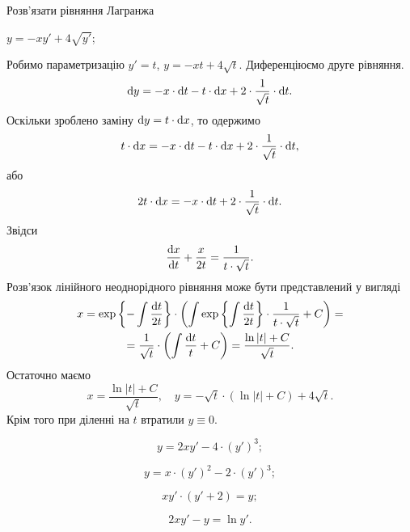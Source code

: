 Розв’язати рівняння Лагранжа
\begin{example}
	$y = - x y' + 4 \sqrt{y'}$;
\end{example}
\begin{solution}
	Робимо параметризацію $y' = t$, $y = - xt + 4 \sqrt{t}$. Диференціюємо друге рівняння.
	\[ \mathop{}\!\mathrm{d} y = - x \cdot \mathop{}\!\mathrm{d} t - t \cdot \mathop{}\!\mathrm{d} x + 2 \cdot \frac{1}{\sqrt{t}} \cdot \mathop{}\!\mathrm{d} t.\]
	Оскільки зроблено заміну $\mathop{}\!\mathrm{d} y = t \cdot \mathop{}\!\mathrm{d} x$, то одержимо
	\[ t \cdot \mathop{}\!\mathrm{d} x = - x \cdot \mathop{}\!\mathrm{d} t - t \cdot \mathop{}\!\mathrm{d} x + 2 \cdot \frac{1}{\sqrt{t}} \cdot \mathop{}\!\mathrm{d} t,\]
	або
	\[ 2 t \cdot \mathop{}\!\mathrm{d} x = - x \cdot \mathop{}\!\mathrm{d} t + 2 \cdot \frac{1}{\sqrt{t}} \cdot \mathop{}\!\mathrm{d} t.\]
	Звідси
	\[ \frac{\mathop{}\!\mathrm{d} x}{\mathop{}\!\mathrm{d} t} + \frac{x}{2t} = \frac{1}{t \cdot \sqrt{t}}.\]
	Розв’язок лінійного неоднорідного рівняння може бути представлений у вигляді
	\begin{multline*}
		x = \exp\left\{ - \int \frac{\mathop{}\!\mathrm{d} t}{2t} \right\} \cdot \left( \int \exp\left\{\int \frac{\mathop{}\!\mathrm{d} t}{2t} \right\} \cdot \frac{1}{t\cdot\sqrt{t}} + C\right) = \\
		= \frac{1}{\sqrt{t}} \cdot \left(\int \frac {\mathop{}\!\mathrm{d} t}{t} + C\right) = \frac{\ln |t| + C}{\sqrt{t}}.
	\end{multline*}
	Остаточно маємо \[ x = \frac{\ln |t| + C}{\sqrt{t}}, \quad y = - \sqrt{t} \cdot (\ln |t| + C) + 4 \sqrt{t}. \] Крім того при діленні на $t$ втратили $y \equiv 0$.
\end{solution}
\begin{multicols}{2}
\begin{problem}
	\[ y = 2 x y' - 4 \cdot (y')^3;\]
\end{problem}
\begin{problem}
	\[ y = x \cdot (y')^2 - 2 \cdot (y')^3;\]
\end{problem}
\begin{problem}
 	\[ x y' \cdot (y' + 2) = y;\]
\end{problem}
\begin{problem}
 	\[ 2 x y' - y = \ln y'.\]
\end{problem}
\end{multicols}
